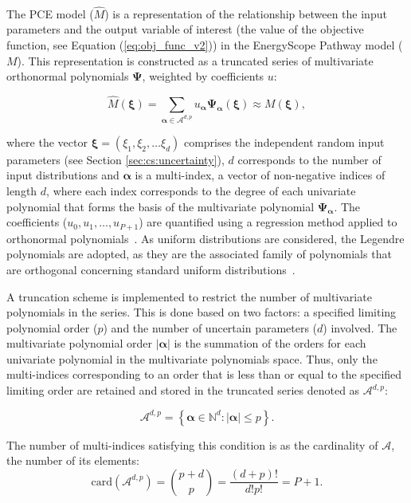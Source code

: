 \\

\noindent
The PCE model ($\hat{M}$) is a representation of the relationship between the input parameters and the output variable of interest (\ie the value of the objective function, see Equation (\ref{eq:obj_func_v2})) in the EnergyScope Pathway model ($M$). This representation is constructed as a truncated series of multivariate orthonormal polynomials $\bm{\Psi}$, weighted by coefficients $u$:

\begin{equation}
\hat{M} \left( \bm{\xi} \right) = \sum_{\bm{\alpha} \in \mathcal{A}^{d,p}} u_{\bm{\alpha}} \bm{\Psi}_{\bm{\alpha}} \left( \bm{\xi} \right) \approx M \left( \bm{\xi} \right), 
\end{equation}

\noindent where the vector $\bm{\xi} = (\xi_1,\xi_2, \dots \xi_d)$ comprises the independent random input parameters (see Section \ref{sec:cs:uncertainty}), $d$ corresponds to the number of input distributions and $\bm{\alpha}$ is a multi-index, \ie a vector of non-negative indices of length $d$, where each index corresponds to the degree of each univariate polynomial that forms the basis of the multivariate polynomial $\bm{\Psi_{\bm{\alpha}}}$. The coefficients ($u_0, u_1, \dots, u_{P+1}$) are quantified using a regression method applied to orthonormal polynomials~\cite{Sudret2014}. As uniform distributions are considered, the Legendre polynomials are adopted, as they are the associated family of polynomials that are orthogonal concerning standard uniform distributions~\cite{Sudret2014}.

A truncation scheme is implemented to restrict the number of multivariate polynomials in the series. This is done based on two factors: a specified limiting polynomial order ($p$) and the number of uncertain parameters ($d$) involved. The multivariate polynomial order $|\bm{\alpha}|$ is the summation of the orders for each univariate polynomial in the multivariate polynomials space. Thus, only the multi-indices corresponding to an order that is less than or equal to the specified limiting order are retained and stored in the truncated series denoted as $\mathcal{A}^{d,p}$:

\begin{equation}
\mathcal{A}^{d,p} = \left \{ \bm{\alpha} \in \mathbb{N}^d : |\bm{\alpha}| \leq p \right \}. 
\end{equation}

The number of multi-indices satisfying this condition is as the cardinality of $\mathcal{A}$, \ie the number of its elements:
\begin{equation}
\mathrm{card} \left( \mathcal{A}^{d,p} \right) = {p + d \choose p} = \dfrac{\left( d + p \right) !}{d! p!} = P + 1.
\label{eq:pce:nterms}
\end{equation}

